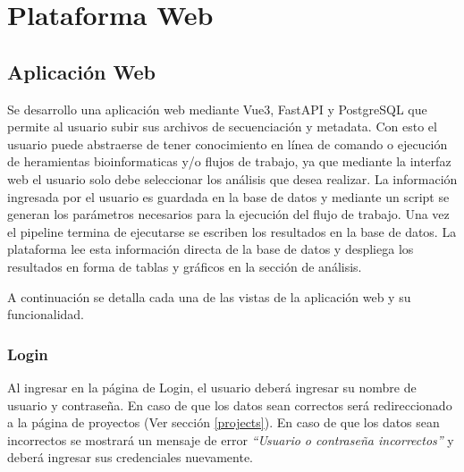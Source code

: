 \chapter{Plataforma Web}
\section{Aplicación Web}
Se desarrollo una aplicación web mediante Vue3, FastAPI y PostgreSQL que permite al usuario subir sus archivos de secuenciación y metadata. 
Con esto el usuario puede abstraerse de tener conocimiento en línea de comando o ejecución de heramientas bioinformaticas y/o flujos de trabajo, 
ya que mediante la interfaz web el usuario solo debe seleccionar los análisis que desea realizar.
La información ingresada por el usuario es guardada en la base de datos y mediante un script se generan los parámetros necesarios para la ejecución del flujo de trabajo.
Una vez el pipeline termina de ejecutarse se escriben los resultados en la base de datos. 
La plataforma lee esta información directa de la base de datos y despliega los resultados en forma de tablas y gráficos en la sección de análisis.


A continuación se detalla cada una de las vistas de la aplicación web y su funcionalidad.

\subsection{Login}
Al ingresar en la página de Login, el usuario deberá ingresar su nombre de usuario y contraseña.
En caso de que los datos sean correctos será redireccionado a la página de proyectos (Ver sección \ref{projects}).
En caso de que los datos sean incorrectos se mostrará un mensaje de error \textit{“Usuario o contraseña incorrectos”} y deberá ingresar sus credenciales nuevamente.


